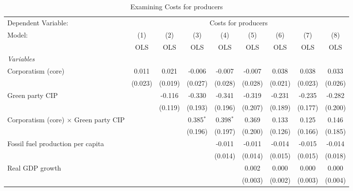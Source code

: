 
\begin{table}[htbp]
   \caption{Examining Costs for producers}
   \centering
   \begin{tabular}{lcccccccc}
      \toprule
      Dependent Variable: & \multicolumn{8}{c}{Costs for producers}\\
      Model:                                       & (1)     & (2)     & (3)         & (4)         & (5)     & (6)         & (7)     & (8)\\  
                                                   &  OLS    & OLS     & OLS         & OLS         & OLS     & OLS         & OLS     & OLS\\  
      \midrule
      \emph{Variables}\\
      Corporatism (core)                           & 0.011   & 0.021   & -0.006      & -0.007      & -0.007  & 0.038       & 0.038   & 0.033\\   
                                                   & (0.023) & (0.019) & (0.027)     & (0.028)     & (0.028) & (0.021)     & (0.023) & (0.026)\\   
      Green party CIP                              &         & -0.116  & -0.330      & -0.341      & -0.319  & -0.231      & -0.235  & -0.282\\   
                                                   &         & (0.119) & (0.193)     & (0.196)     & (0.207) & (0.189)     & (0.177) & (0.200)\\   
      Corporatism (core) $\times$ Green party CIP  &         &         & 0.385$^{*}$ & 0.398$^{*}$ & 0.369   & 0.133       & 0.125   & 0.146\\   
                                                   &         &         & (0.196)     & (0.197)     & (0.200) & (0.126)     & (0.166) & (0.185)\\   
      Fossil fuel production per capita            &         &         &             & -0.011      & -0.011  & -0.014      & -0.015  & -0.014\\   
                                                   &         &         &             & (0.014)     & (0.014) & (0.015)     & (0.015) & (0.018)\\   
      Real GDP growth                              &         &         &             &             & 0.002   & 0.000       & 0.000   & 0.000\\   
                                                   &         &         &             &             & (0.003) & (0.002)     & (0.003) & (0.004)\\   

\end{tabular}
\end{table}
